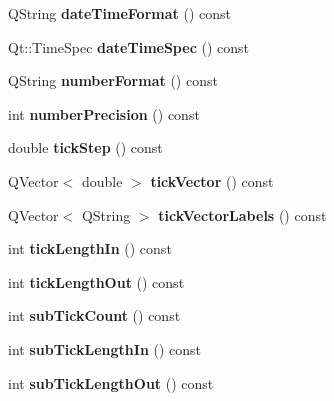 \begin{DoxyCompactItemize}
Q\+String {\bfseries date\+Time\+Format} () const
\item 
\mbox{\label{class_q_c_p_axis_aea1341545f772173451671744e50ea22}} 
Qt\+::\+Time\+Spec {\bfseries date\+Time\+Spec} () const
\item 
\mbox{\label{class_q_c_p_axis_a20cc29c2f282a0e9efd8f32145e47be6}} 
Q\+String {\bfseries number\+Format} () const
\item 
\mbox{\label{class_q_c_p_axis_a2562b6f3a4a01c7ed83a388042664998}} 
int {\bfseries number\+Precision} () const
\item 
\mbox{\label{class_q_c_p_axis_a951320db20b7add3dc30853fcbf3b520}} 
double {\bfseries tick\+Step} () const
\item 
\mbox{\label{class_q_c_p_axis_a5aad9d6b34821ab0751dfc38dbc92a46}} 
Q\+Vector$<$ double $>$ {\bfseries tick\+Vector} () const
\item 
\mbox{\label{class_q_c_p_axis_a1bd4a9036e0c9fc68b6f3df81f07e55f}} 
Q\+Vector$<$ Q\+String $>$ {\bfseries tick\+Vector\+Labels} () const
\item 
\mbox{\label{class_q_c_p_axis_ace2accb350fd3f3f474280f58c1d61c5}} 
int {\bfseries tick\+Length\+In} () const
\item 
\mbox{\label{class_q_c_p_axis_ad3ba6614ccddf351f133e0acdd4f021e}} 
int {\bfseries tick\+Length\+Out} () const
\item 
\mbox{\label{class_q_c_p_axis_aba4695601f385cb4fe48b7d0dfa4efb9}} 
int {\bfseries sub\+Tick\+Count} () const
\item 
\mbox{\label{class_q_c_p_axis_af907c8ecc4624d1bf4a8f6f702e64fbe}} 
int {\bfseries sub\+Tick\+Length\+In} () const
\item 
\mbox{\label{class_q_c_p_axis_ac98c66cae50c98f3ae90e2969382976d}} 
int {\bfseries sub\+Tick\+Length\+Out} () const
\item 
\mbox{\label{class_q_c_p_axis_a216974be018e73008b3cf6d033c1325d}} 

\end{DoxyCompactItemize}
